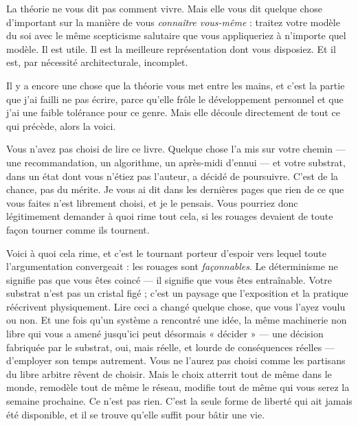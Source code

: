 \documentclass[11pt, twoside, openright]{book}
\begin{document}
La théorie ne vous dit pas comment vivre. Mais elle vous dit quelque chose d'important sur la manière de vous \textit{connaître vous-même} : traitez votre modèle du soi avec le même scepticisme salutaire que vous appliqueriez à n'importe quel modèle. Il est utile. Il est la meilleure représentation dont vous disposiez. Et il est, par nécessité architecturale, incomplet.

Il y a encore une chose que la théorie vous met entre les mains, et c'est la partie que j'ai failli ne pas écrire, parce qu'elle frôle le développement personnel et que j'ai une faible tolérance pour ce genre. Mais elle découle directement de tout ce qui précède, alors la voici.

Vous n'avez pas choisi de lire ce livre. Quelque chose l'a mis sur votre chemin --- une recommandation, un algorithme, un après-midi d'ennui --- et votre substrat, dans un état dont vous n'étiez pas l'auteur, a décidé de poursuivre. C'est de la chance, pas du mérite. Je vous ai dit dans les dernières pages que rien de ce que vous faites n'est librement choisi, et je le pensais. Vous pourriez donc légitimement demander à quoi rime tout cela, si les rouages devaient de toute façon tourner comme ils tournent.

Voici à quoi cela rime, et c'est le tournant porteur d'espoir vers lequel toute l'argumentation convergeait : les rouages sont \textit{façonnables}. Le déterminisme ne signifie pas que vous êtes coincé --- il signifie que vous êtes entraînable. Votre substrat n'est pas un cristal figé ; c'est un paysage que l'exposition et la pratique réécrivent physiquement. Lire ceci a changé quelque chose, que vous l'ayez voulu ou non. Et une fois qu'un système a rencontré une idée, la même machinerie non libre qui vous a amené jusqu'ici peut désormais « décider » --- une décision fabriquée par le substrat, oui, mais réelle, et lourde de conséquences réelles --- d'employer son temps autrement. Vous ne l'aurez pas choisi comme les partisans du libre arbitre rêvent de choisir. Mais le choix atterrit tout de même dans le monde, remodèle tout de même le réseau, modifie tout de même qui vous serez la semaine prochaine. Ce n'est pas rien. C'est la seule forme de liberté qui ait jamais été disponible, et il se trouve qu'elle suffit pour bâtir une vie.
\end{document}
